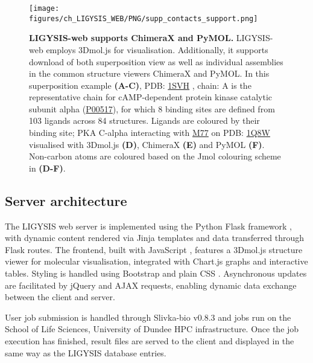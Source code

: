 \begin{figure}[htb!]
    \centering
    \texttt{[image: figures/ch\_LIGYSIS\_WEB/PNG/supp\_contacts\_support.png]}
    \caption[LIGYSIS-web supports ChimeraX and PyMOL]{\textbf{LIGYSIS-web supports ChimeraX and PyMOL.} LIGYSIS-web employs 3Dmol.js for visualisation. Additionally, it supports download of both superposition view as well as individual assemblies in the common structure viewers ChimeraX and PyMOL. In this superposition example \textbf{(A-C)}, PDB: \href{https://www.ebi.ac.uk/pdbe/entry/pdb/1svh}{1SVH} \cite{BREITENLECHNER_2004_PKB}, chain: A is the representative chain for cAMP-dependent protein kinase catalytic subunit alpha (\href{https://www.uniprot.org/uniprotkb/P00517/entry}{P00517}), for which 8 binding sites are defined from 103 ligands across 84 structures. Ligands are coloured by their binding site; PKA C-alpha interacting with \href{https://www.ebi.ac.uk/pdbe-srv/pdbechem/chemicalCompound/show/M77}{M77} on PDB: \href{https://www.ebi.ac.uk/pdbe/entry/pdb/1q8w}{1Q8W} visualised with 3Dmol.js \textbf{(D)}, ChimeraX \textbf{(E)} and PyMOL \textbf{(F)}. Non-carbon atoms are coloured based on the Jmol colouring scheme \cite{JMOL} in \textbf{(D-F)}.}
    \label{fig:supp_suport}
\end{figure}

\subsection{Server architecture}

The LIGYSIS web server is implemented using the Python Flask framework \cite{GRINBERG_2018_FLASK}, with dynamic content rendered via Jinja \cite{JINJA} templates and data transferred through Flask routes. The frontend, built with JavaScript \cite{JAVASCRIPT}, features a 3Dmol.js \cite{REGO_2014_3DMOL, SESHADRI_2020_3DMOL} structure viewer for molecular visualisation, integrated with Chart.js \cite{CHARTJS} graphs and interactive tables. Styling is handled using Bootstrap \cite{BOOTSTRAP} and plain CSS \cite{HTML_CSS}. Asynchronous updates are facilitated by jQuery \cite{jQUERY} and AJAX \cite{AJAX} requests, enabling dynamic data exchange between the client and server.

User job submission is handled through Slivka-bio v0.8.3 \cite{MACGOWAN_2020_DRSASP, WAROWNY_2021_SLIVKA, SLIVKA_BIO} and jobs run on the School of Life Sciences, University of Dundee HPC infrastructure. Once the job execution has finished, result files are served to the client and displayed in the same way as the LIGYSIS database entries.

